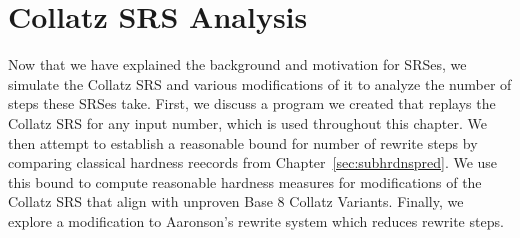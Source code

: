 

\chapter{Collatz SRS Analysis} \label{sec:hardnessrewriterules}
Now that we have explained the background and motivation for SRSes, we simulate the Collatz SRS and various modifications of it to analyze the number of steps these SRSes take. First, we discuss a program we created that replays the Collatz SRS for any input number, which is used throughout this chapter. We then attempt to establish a reasonable bound for number of rewrite steps by comparing classical hardness reecords from Chapter~\ref{sec:subhrdnspred}. We use this bound to compute reasonable hardness measures for modifications of the Collatz SRS that align with unproven Base 8 Collatz Variants. Finally, we explore a modification to Aaronson's rewrite system which reduces rewrite steps.
